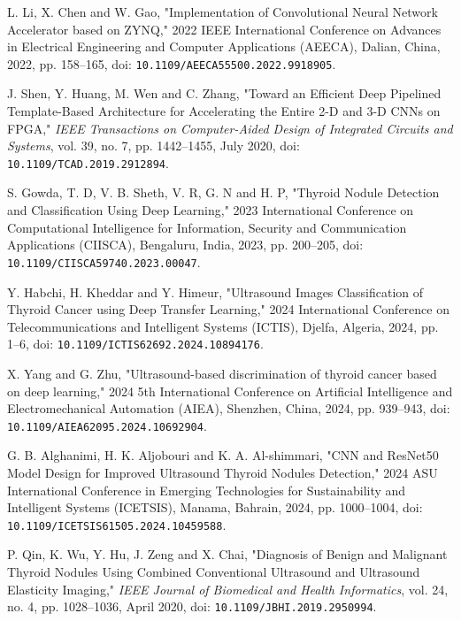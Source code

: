\documentclass[12pt, a4paper]{report}
\begin{document}
 
 \begin{thebibliography}{99}

 L. Li, X. Chen and W. Gao, "Implementation of Convolutional Neural Network Accelerator based on ZYNQ," 2022 IEEE International Conference on Advances in Electrical Engineering and Computer Applications (AEECA), Dalian, China, 2022, pp. 158--165, doi: \texttt{10.1109/AEECA55500.2022.9918905}.

 J. Shen, Y. Huang, M. Wen and C. Zhang, "Toward an Efficient Deep Pipelined Template-Based Architecture for Accelerating the Entire 2-D and 3-D CNNs on FPGA," \textit{IEEE Transactions on Computer-Aided Design of Integrated Circuits and Systems}, vol. 39, no. 7, pp. 1442--1455, July 2020, doi: \texttt{10.1109/TCAD.2019.2912894}.

 S. Gowda, T. D, V. B. Sheth, V. R, G. N and H. P, "Thyroid Nodule Detection and Classification Using Deep Learning," 2023 International Conference on Computational Intelligence for Information, Security and Communication Applications (CIISCA), Bengaluru, India, 2023, pp. 200--205, doi: \texttt{10.1109/CIISCA59740.2023.00047}.

 Y. Habchi, H. Kheddar and Y. Himeur, "Ultrasound Images Classification of Thyroid Cancer using Deep Transfer Learning," 2024 International Conference on Telecommunications and Intelligent Systems (ICTIS), Djelfa, Algeria, 2024, pp. 1--6, doi: \texttt{10.1109/ICTIS62692.2024.10894176}.

 X. Yang and G. Zhu, "Ultrasound-based discrimination of thyroid cancer based on deep learning," 2024 5th International Conference on Artificial Intelligence and Electromechanical Automation (AIEA), Shenzhen, China, 2024, pp. 939--943, doi: \texttt{10.1109/AIEA62095.2024.10692904}.

 G. B. Alghanimi, H. K. Aljobouri and K. A. Al-shimmari, "CNN and ResNet50 Model Design for Improved Ultrasound Thyroid Nodules Detection," 2024 ASU International Conference in Emerging Technologies for Sustainability and Intelligent Systems (ICETSIS), Manama, Bahrain, 2024, pp. 1000--1004, doi: \texttt{10.1109/ICETSIS61505.2024.10459588}.

 P. Qin, K. Wu, Y. Hu, J. Zeng and X. Chai, "Diagnosis of Benign and Malignant Thyroid Nodules Using Combined Conventional Ultrasound and Ultrasound Elasticity Imaging," \textit{IEEE Journal of Biomedical and Health Informatics}, vol. 24, no. 4, pp. 1028--1036, April 2020, doi: \texttt{10.1109/JBHI.2019.2950994}.


\end{thebibliography}
\end{document}
